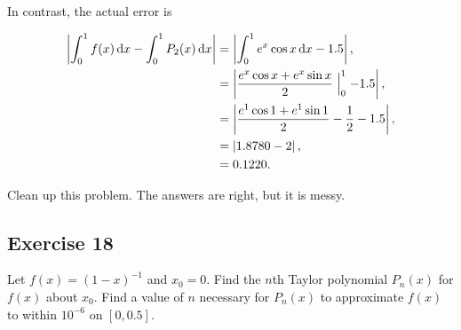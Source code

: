 \documentclass[a4paper, 10pt]{article}
\newenvironment{answer}[1][Answer]{\begin{trivlist}
\item[\hskip\labelsep{\textit{#1.}}]}{\end{trivlist}}
\begin{document}
\begin{answer}
\begin{enumerate}[(a)]
			In contrast, the actual error is

			\begin{align*}
				\left| \int_0^1 f(x) \dd{x} - \int_0^1 P_2(x) \dd{x} \right| 
				&= \left| \int_0^1 e^x \cos{x} \dd{x} - 1.5 \right|,\\
				&= \left| \frac{e^x \cos{x} + e^x \sin{x}}{2} \Bigm|_0^1 - 1.5 \right|,\\
				&= \left| \frac{e^1 \cos{1} + e^1 \sin{1}}{2} - \frac{1}{2} - 1.5 \right|,\\
				&= \left| 1.8780 - 2 \right|,\\
				&= 0.1220.
			\end{align*}
	\end{enumerate}

	{\color{blue} Clean up this problem. The answers are right, but it is messy.}
\end{answer}

\subsection{Exercise 18}

Let $f(x)=(1-x)^{-1}$ and $x_0=0$. Find the $n$th Taylor polynomial $P_n(x)$ for $f(x)$ about $x_0$. Find a value of $n$ necessary for $P_n(x)$ to approximate $f(x)$ to within $10^{-6}$ on $[0, 0.5]$.
\end{document}
